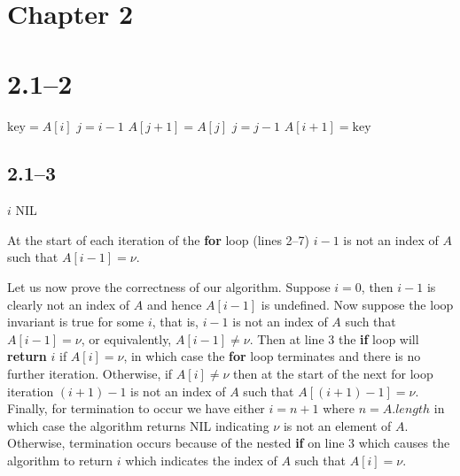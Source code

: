 \section{Chapter 2}
\label{sec:chp2}

\section*{2.1--2}

\begin{algorithmic}[1]
	\State $\text{key} = A[i]$
	\State $j = i - 1$
	\State $A[j+1] = A[j]$
	\State $j = j - 1$
	\EndWhile
	\State $A[i+1]=\text{key}$
	\EndFor
	\EndProcedure
\end{algorithmic}

\subsection*{2.1--3}

\begin{algorithmic}[1]
	\State \Return $i$
	\EndIf
	\State \Return NIL
	\EndFor
	\EndProcedure
\end{algorithmic}

At the start of each iteration of the \textbf{for} loop (lines 2--7) $i-1$ is not an index of $A$ such that $A[i-1]=\nu$.

Let us now prove the correctness of our algorithm. Suppose $i=0$, then $i-1$ is clearly not an index of $A$ and hence $A[i-1]$ is undefined. Now suppose the loop invariant is true for some $i$, that is, $i-1$ is not an index of $A$ such that $A[i-1]=\nu$, or equivalently, $A[i-1]\neq\nu$. Then at line 3 the \textbf{if} loop will \textbf{return} $i$ if $A[i]=\nu$, in which case the \textbf{for} loop terminates and there is no further iteration. Otherwise, if $A[i]\neq\nu$ then at the start of the next for loop iteration $(i+1)-1$ is not an index of $A$ such that $A[(i+1)-1]=\nu$. Finally, for termination to occur we have either $i=n+1$ where $n=A.length$ in which case the algorithm returns NIL indicating $\nu$ is not an element of $A$. Otherwise, termination occurs because of the nested \textbf{if} on line 3 which causes the algorithm to return $i$ which indicates the index of $A$ such that $A[i]=\nu$.

